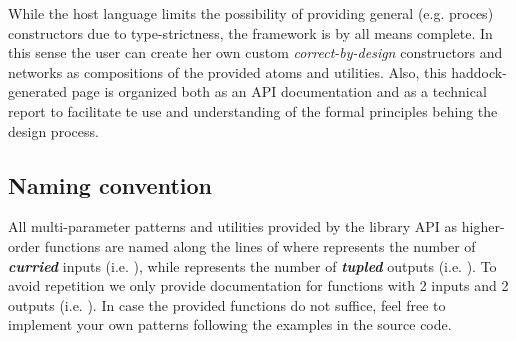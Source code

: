 While the host language limits the possibility of providing general
(e.g. proces) constructors due to type-strictness, the
 framework is by all means complete. In this sense the
user can create her own custom \emph{correct-by-design} constructors and
networks as compositions of the provided atoms and utilities. Also,
this haddock-generated page is organized both as an API
documentation and as a technical report to facilitate te use and
understanding of the formal principles behing the design process.\par

\subsection{Naming convention}
\label{sec:forsyde-atom:naming-convention}

All multi-parameter patterns and
utilities provided by the library API as higher-order functions are
named along the lines of  where  represents the
number of \textbf{\emph{curried}} inputs (i.e. ),
while  represents the number of \textbf{\emph{tupled}} outputs
(i.e. ). To avoid repetition we only provide
documentation for functions with 2 inputs and 2 outputs
(i.e. ). In case the provided functions do not suffice,
feel free to implement your own patterns following the examples in
the source code.\par
